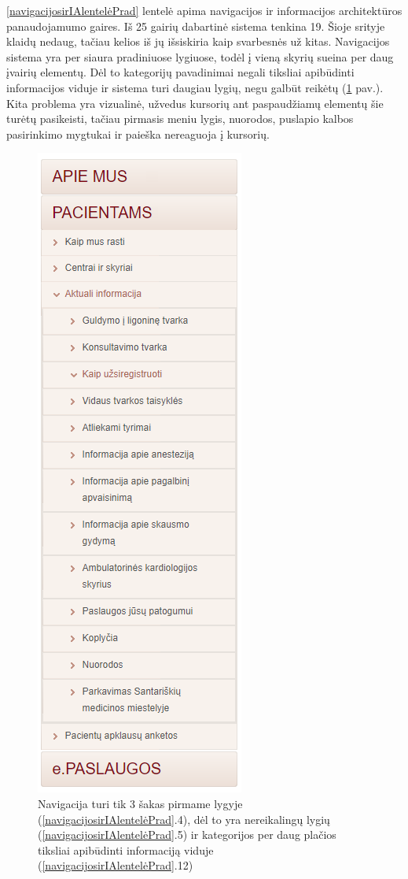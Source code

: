 \documentclass{VUMIFPSkursinis}
\begin{document}
\ref{navigacijosirIAlentelėPrad} lentelė apima navigacijos ir informacijos architektūros panaudojamumo gaires. Iš 25 gairių dabartinė sistema tenkina 19.
Šioje srityje klaidų nedaug, tačiau kelios iš jų išsiskiria kaip svarbesnės už kitas. Navigacijos sistema yra per siaura pradiniuose lygiuose, todėl į vieną skyrių sueina per daug įvairių elementų. Dėl to kategorijų pavadinimai negali tiksliai apibūdinti informacijos viduje ir sistema turi daugiau lygių, negu galbūt reikėtų (\ref{img:siauranavigacija} pav.).
Kita problema yra vizualinė, užvedus kursorių ant paspaudžiamų elementų šie turėtų pasikeisti, tačiau pirmasis meniu lygis, nuorodos, puslapio kalbos pasirinkimo mygtukai ir paieška nereaguoja į kursorių.

\begin{figure}[H]
    \centering
    \includegraphics[scale=0.55]{img/SiauraNavigacija}
    \caption{Navigacija turi tik 3 šakas pirmame lygyje (\ref{navigacijosirIAlentelėPrad}.4), dėl to yra nereikalingų lygių (\ref{navigacijosirIAlentelėPrad}.5) ir kategorijos per daug plačios tiksliai apibūdinti informaciją viduje (\ref{navigacijosirIAlentelėPrad}.12)}
    \label{img:siauranavigacija}
\end{figure}
\end{document}
